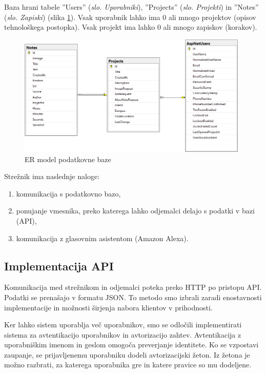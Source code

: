 \documentclass[a4paper, 12pt]{book}
\begin{document}
Baza hrani tabele ''Users'' (\textit{slo. Uporabniki}), ''Projects'' (\textit{slo. Projekti}) in ''Notes'' (\textit{slo. Zapiski}) (slika \ref{er_diagram}).
Vsak uporabnik lahko ima 0 ali mnogo projektov (opisov tehnološkega postopka).
Vsak projekt ima lahko 0 ali mnogo zapiskov (korakov).

\begin{figure}[H]
\begin{center}
\includegraphics[width=11cm]{er_diagram_small}
\end{center}
\caption{ER model podatkovne baze}
\label{er_diagram}
\end{figure}


\noindent Strežnik ima naslednje naloge:
\begin{enumerate}
	\item komunikacija s podatkovno bazo,
	\item ponujanje vmesnika, preko katerega lahko odjemalci delajo s podatki v bazi (API),
	\item komunikacija z glasovnim asistentom (Amazon Alexa).
\end{enumerate}


\subsection{Implementacija API}

Komunikacija med strežnikom in odjemalci poteka preko HTTP po pristopu API.
Podatki se prenašajo v formatu JSON.
To metodo smo izbrali zaradi enostavnosti implementacije in možnosti širjenja nabora klientov v prihodnosti.

Ker lahko sistem uporablja več uporabnikov, smo se odločili implementirati sistema za avtentikacijo uporabnikov in avtorizacijo zahtev.
Avtentikacija z uporabniškim imenom in geslom omogoča preverjanje identitete.
Ko se vzpostavi zaupanje, se prijavljenemu uporabniku dodeli avtorizacijski žeton.
Iz žetona je možno razbrati, za katerega uporabnika gre in katere pravice so mu dodeljene.
\end{document}

